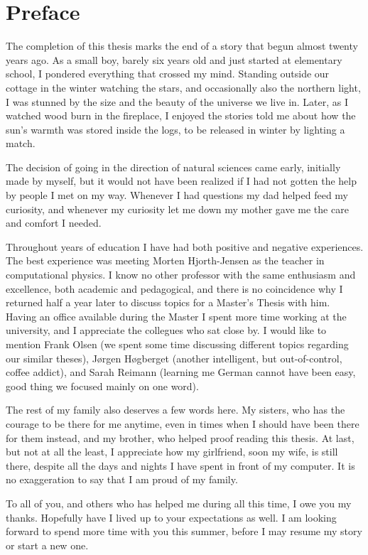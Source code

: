\chapter*{Preface}
The completion of this thesis marks the end of a story that begun almost twenty years ago.
As a small boy, barely six years old and just started at elementary school, I pondered everything that crossed my mind.
Standing outside our cottage in the winter watching the stars, and occasionally also the northern light, I was stunned by the size and the beauty of the universe we live in.
Later, as I watched wood burn in the fireplace, I enjoyed the stories told me about how the sun's warmth was stored inside the logs, to be released in winter by lighting a match.

 
The decision of going in the direction of natural sciences came early, initially made by myself, but it would not have been realized if I had not gotten the help by people I met on my way.
Whenever I had questions my dad helped feed my curiosity, and whenever my curiosity let me down my mother gave me the care and comfort I needed.

 
Throughout years of education I have had both positive and negative experiences.
The best experience was meeting Morten Hjorth-Jensen as the teacher in computational physics.
I know no other professor with the same enthusiasm and excellence, both academic and pedagogical, and there is no coincidence why I returned half a year later to discuss topics for a Master's Thesis with him.
Having an office available during the Master I spent more time working at the university, and I appreciate the collegues who sat close by.
I would like to mention Frank Olsen (we spent some time discussing different topics regarding our similar theses), Jørgen Høgberget (another intelligent, but out-of-control, coffee addict), and Sarah Reimann (learning me German cannot have been easy, good thing we focused mainly on one word).

 
The rest of my family also deserves a few words here. 
My sisters, who has the courage to be there for me anytime, even in times when I should have been there for them instead, and my brother, who helped proof reading this thesis.
At last, but not at all the least, I appreciate how my girlfriend, soon my wife, is still there, despite all the days and nights I have spent in front of my computer.
It is no exaggeration to say that I am proud of my family.

 
To all of you, and others who has helped me during all this time, I owe you my thanks.
Hopefully have I lived up to your expectations as well.
I am looking forward to spend more time with you this summer, before I may resume my story or start a new one.




